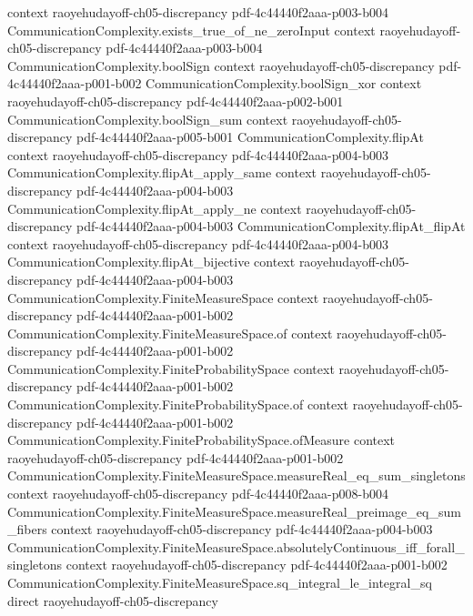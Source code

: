 \begin{lemma}
  {context}
  {raoyehudayoff-ch05-discrepancy}
  {pdf-4c44440f2aaa-p003-b004}
\proofstep
  {CommunicationComplexity.exists_true_of_ne_zeroInput}
  {context}
  {raoyehudayoff-ch05-discrepancy}
  {pdf-4c44440f2aaa-p003-b004}
\proofstep
  {CommunicationComplexity.boolSign}
  {context}
  {raoyehudayoff-ch05-discrepancy}
  {pdf-4c44440f2aaa-p001-b002}
\proofstep
  {CommunicationComplexity.boolSign_xor}
  {context}
  {raoyehudayoff-ch05-discrepancy}
  {pdf-4c44440f2aaa-p002-b001}
\proofstep
  {CommunicationComplexity.boolSign_sum}
  {context}
  {raoyehudayoff-ch05-discrepancy}
  {pdf-4c44440f2aaa-p005-b001}
\proofstep
  {CommunicationComplexity.flipAt}
  {context}
  {raoyehudayoff-ch05-discrepancy}
  {pdf-4c44440f2aaa-p004-b003}
\proofstep
  {CommunicationComplexity.flipAt_apply_same}
  {context}
  {raoyehudayoff-ch05-discrepancy}
  {pdf-4c44440f2aaa-p004-b003}
\proofstep
  {CommunicationComplexity.flipAt_apply_ne}
  {context}
  {raoyehudayoff-ch05-discrepancy}
  {pdf-4c44440f2aaa-p004-b003}
\proofstep
  {CommunicationComplexity.flipAt_flipAt}
  {context}
  {raoyehudayoff-ch05-discrepancy}
  {pdf-4c44440f2aaa-p004-b003}
\proofstep
  {CommunicationComplexity.flipAt_bijective}
  {context}
  {raoyehudayoff-ch05-discrepancy}
  {pdf-4c44440f2aaa-p004-b003}
\proofstep
  {CommunicationComplexity.FiniteMeasureSpace}
  {context}
  {raoyehudayoff-ch05-discrepancy}
  {pdf-4c44440f2aaa-p001-b002}
\proofstep
  {CommunicationComplexity.FiniteMeasureSpace.of}
  {context}
  {raoyehudayoff-ch05-discrepancy}
  {pdf-4c44440f2aaa-p001-b002}
\proofstep
  {CommunicationComplexity.FiniteProbabilitySpace}
  {context}
  {raoyehudayoff-ch05-discrepancy}
  {pdf-4c44440f2aaa-p001-b002}
\proofstep
  {CommunicationComplexity.FiniteProbabilitySpace.of}
  {context}
  {raoyehudayoff-ch05-discrepancy}
  {pdf-4c44440f2aaa-p001-b002}
\proofstep
  {CommunicationComplexity.FiniteProbabilitySpace.ofMeasure}
  {context}
  {raoyehudayoff-ch05-discrepancy}
  {pdf-4c44440f2aaa-p001-b002}
\proofstep
  {CommunicationComplexity.FiniteMeasureSpace.measureReal_eq_sum_singletons}
  {context}
  {raoyehudayoff-ch05-discrepancy}
  {pdf-4c44440f2aaa-p008-b004}
\proofstep
  {CommunicationComplexity.FiniteMeasureSpace.measureReal_preimage_eq_sum_fibers}
  {context}
  {raoyehudayoff-ch05-discrepancy}
  {pdf-4c44440f2aaa-p004-b003}
\proofstep
  {CommunicationComplexity.FiniteMeasureSpace.absolutelyContinuous_iff_forall_singletons}
  {context}
  {raoyehudayoff-ch05-discrepancy}
  {pdf-4c44440f2aaa-p001-b002}
\proofstep
  {CommunicationComplexity.FiniteMeasureSpace.sq_integral_le_integral_sq}
  {direct}
  {raoyehudayoff-ch05-discrepancy}

\end{lemma}
